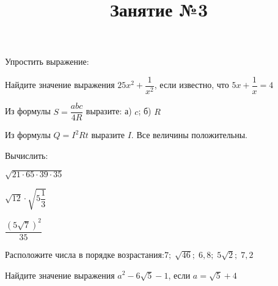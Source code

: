 \begin{listofex}
	\item Упростить выражение:
	\begin{enumcols}[itemcolumns=2]
		\item {}
		\item {}
		\item {}
		\item {}
		\item {}
		\item {}
	\end{enumcols}
	\item {}
	\item {}
	\item Найдите значение выражения \( 25x^2+\dfrac{1}{x^2} \), если известно, что \( 5x+\dfrac{1}{x}=4 \)
	\item Из формулы \( S=\dfrac{abc}{4R} \) выразите: а) \( c \); б) \( R \)
	\item Из формулы \( Q=I^2Rt \) выразите \( I \). Все величины положительны.
	\item Вычислить:
	\begin{enumcols}[itemcolumns=3]
		\item \( \sqrt{21\cdot65\cdot39\cdot35} \)
		\item \( \sqrt{12}\cdot\sqrt{5\dfrac{1}{3}} \)
		\item \( \dfrac{(5\sqrt{7})^2}{35} \)
	\end{enumcols}
	\item Расположите числа в порядке возрастания:\quad\( 7;\;\sqrt{46};\;6,8;\;5\sqrt{2};\;7,2 \)
	\item Найдите значение выражения \( a^2-6\sqrt{5}-1 \), если \( a=\sqrt{5}+4 \)
\end{listofex}
\newpage
\title{Занятие №3}
